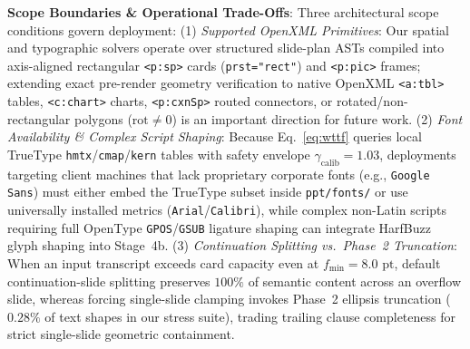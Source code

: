 \documentclass[10pt,journal,compsoc]{IEEEtran}
\begin{document}
\textbf{Scope Boundaries \& Operational Trade-Offs}: Three architectural scope conditions govern deployment: (1) \emph{Supported OpenXML Primitives}: Our spatial and typographic solvers operate over structured slide-plan ASTs compiled into axis-aligned rectangular \texttt{<p:sp>} cards (\texttt{prst="rect"}) and \texttt{<p:pic>} frames; extending exact pre-render geometry verification to native OpenXML \texttt{<a:tbl>} tables, \texttt{<c:chart>} charts, \texttt{<p:cxnSp>} routed connectors, or rotated/non-rectangular polygons ($\text{rot} \neq 0$) is an important direction for future work. (2) \emph{Font Availability \& Complex Script Shaping}: Because Eq.~\eqref{eq:wttf} queries local TrueType \texttt{hmtx}/\texttt{cmap}/\texttt{kern} tables with safety envelope $\gamma_{\text{calib}} = 1.03$, deployments targeting client machines that lack proprietary corporate fonts (e.g., \texttt{Google Sans}) must either embed the TrueType subset inside \texttt{ppt/fonts/} or use universally installed metrics (\texttt{Arial}/\texttt{Calibri}), while complex non-Latin scripts requiring full OpenType \texttt{GPOS}/\texttt{GSUB} ligature shaping can integrate HarfBuzz glyph shaping into Stage~4b. (3) \emph{Continuation Splitting vs.\ Phase~2 Truncation}: When an input transcript exceeds card capacity even at $f_{\min} = 8.0\text{ pt}$, default continuation-slide splitting preserves $100\%$ of semantic content across an overflow slide, whereas forcing single-slide clamping invokes Phase~2 ellipsis truncation ($0.28\%$ of text shapes in our stress suite), trading trailing clause completeness for strict single-slide geometric containment.
\end{document}
